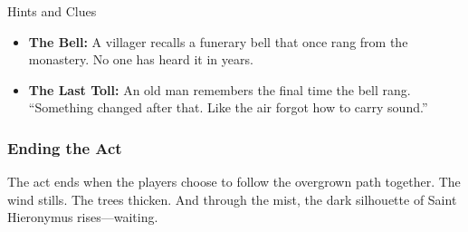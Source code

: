 \begin{Example}{Hints and Clues}
    \begin{itemize}
        \item \textbf{The Bell:} A villager recalls a funerary bell that once rang from the monastery. No one has heard it in years.
        \item \textbf{The Last Toll:} An old man remembers the final time the bell rang. “Something changed after that. Like the air forgot how to carry sound.”
    \end{itemize}
\end{Example}


\subsubsection{Ending the Act}
The act ends when the players choose to follow the overgrown path together. The wind stills. The trees thicken. And through the mist, the dark silhouette of Saint Hieronymus rises—waiting.

